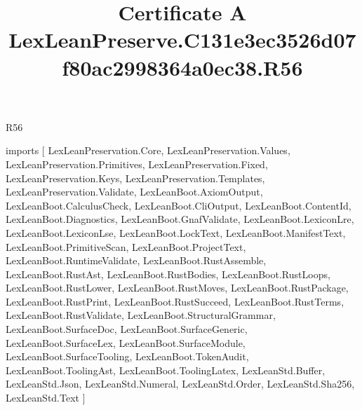 \begin{lexlean}{R56}
\title{Certificate A LexLeanPreserve.C131e3ec3526d07f80ac2998364a0ec38.R56}
\begin{coremodule}
imports [
  LexLeanPreservation.Core,
  LexLeanPreservation.Values,
  LexLeanPreservation.Primitives,
  LexLeanPreservation.Fixed,
  LexLeanPreservation.Keys,
  LexLeanPreservation.Templates,
  LexLeanPreservation.Validate,
  LexLeanBoot.AxiomOutput,
  LexLeanBoot.CalculusCheck,
  LexLeanBoot.CliOutput,
  LexLeanBoot.ContentId,
  LexLeanBoot.Diagnostics,
  LexLeanBoot.GnafValidate,
  LexLeanBoot.LexiconLre,
  LexLeanBoot.LexiconLse,
  LexLeanBoot.LockText,
  LexLeanBoot.ManifestText,
  LexLeanBoot.PrimitiveScan,
  LexLeanBoot.ProjectText,
  LexLeanBoot.RuntimeValidate,
  LexLeanBoot.RustAssemble,
  LexLeanBoot.RustAst,
  LexLeanBoot.RustBodies,
  LexLeanBoot.RustLoops,
  LexLeanBoot.RustLower,
  LexLeanBoot.RustMoves,
  LexLeanBoot.RustPackage,
  LexLeanBoot.RustPrint,
  LexLeanBoot.RustSucceed,
  LexLeanBoot.RustTerms,
  LexLeanBoot.RustValidate,
  LexLeanBoot.StructuralGrammar,
  LexLeanBoot.SurfaceDoc,
  LexLeanBoot.SurfaceGeneric,
  LexLeanBoot.SurfaceLex,
  LexLeanBoot.SurfaceModule,
  LexLeanBoot.SurfaceTooling,
  LexLeanBoot.TokenAudit,
  LexLeanBoot.ToolingAst,
  LexLeanBoot.ToolingLatex,
  LexLeanStd.Buffer,
  LexLeanStd.Json,
  LexLeanStd.Numeral,
  LexLeanStd.Order,
  LexLeanStd.Sha256,
  LexLeanStd.Text
]


\end{coremodule}
\end{lexlean}
